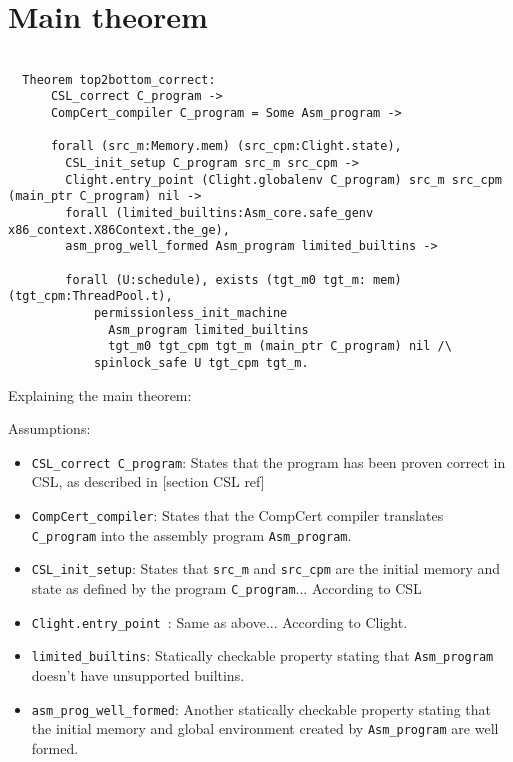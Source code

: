 \section{Main theorem}
\label{sec:topbottom:theorem}

\begin{table}
\begin{lstlisting}
	
  Theorem top2bottom_correct:
      CSL_correct C_program ->
      CompCert_compiler C_program = Some Asm_program ->
      
      forall (src_m:Memory.mem) (src_cpm:Clight.state),
        CSL_init_setup C_program src_m src_cpm ->
        Clight.entry_point (Clight.globalenv C_program) src_m src_cpm (main_ptr C_program) nil ->
        forall (limited_builtins:Asm_core.safe_genv x86_context.X86Context.the_ge),
        asm_prog_well_formed Asm_program limited_builtins ->
        
        forall (U:schedule), exists (tgt_m0 tgt_m: mem) (tgt_cpm:ThreadPool.t),
            permissionless_init_machine
              Asm_program limited_builtins
              tgt_m0 tgt_cpm tgt_m (main_ptr C_program) nil /\
            spinlock_safe U tgt_cpm tgt_m.

\end{lstlisting}
\end{table}
Explaining the main theorem:

Assumptions:

\begin{itemize}
\item \lstinline{CSL_correct C_program}: States that the program has been proven correct in CSL, 
as described in  [section CSL ref] %

\item \lstinline{CompCert_compiler}: States that the CompCert compiler translates 
\lstinline{C_program} into the assembly program \lstinline{Asm_program}.  

\item \lstinline{CSL_init_setup}:  States that \lstinline{src_m} and \lstinline{src_cpm} are the initial 
memory and state as defined by the program \lstinline{C_program}... According to CSL

\item \lstinline{Clight.entry_point }: Same as above... According to Clight. %

\item \lstinline{limited_builtins}: Statically checkable property stating that \lstinline{Asm_program} 
doesn't have unsupported builtins.

\item \lstinline{asm_prog_well_formed}: Another statically checkable property stating that the initial 
memory and global environment created by \lstinline{Asm_program} are well formed.
\end{itemize}

